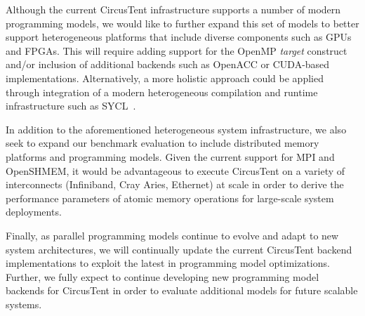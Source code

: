 
Although the current CircusTent infrastructure supports a number of modern programming models, we would like to further expand this set of models to better support heterogeneous platforms that include diverse components such as GPUs and FPGAs.
This will require adding support for the OpenMP \textit{target} construct and/or inclusion of additional backends such as OpenACC or CUDA-based implementations.
Alternatively, a more holistic approach could be applied through integration of a modern heterogeneous compilation and runtime infrastructure such as SYCL~\cite{10.1145/3204919.3204930}.  

In addition to the aforementioned heterogeneous system infrastructure, we also seek to expand our benchmark evaluation to include distributed memory platforms and programming models.
Given the current support for MPI and OpenSHMEM, it would be advantageous to execute CircusTent on a variety of interconnects (Infiniband, Cray Aries, Ethernet) at scale in order to derive the performance parameters of atomic memory operations for large-scale system deployments.   

Finally, as parallel programming models continue to evolve and adapt to new system architectures, we will continually update the current CircusTent backend implementations to exploit the latest in programming model optimizations.
Further, we fully expect to continue developing new programming model backends for CircusTent in order to evaluate additional models for future scalable systems.  